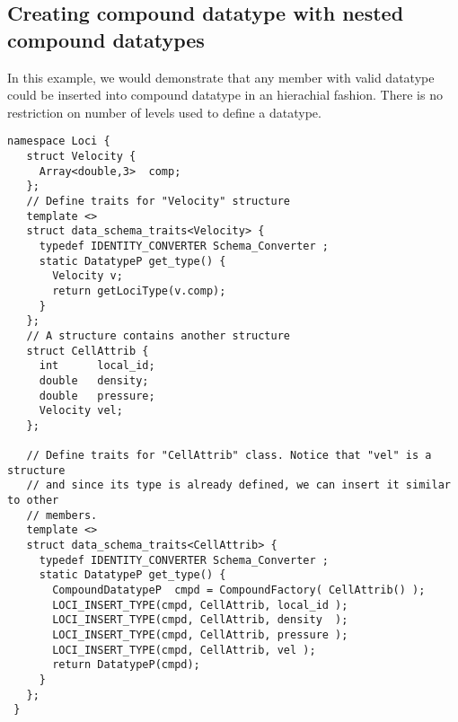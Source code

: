 \subsection{Creating compound datatype with nested compound
datatypes}
In this example, we would demonstrate that any member with valid
datatype could be inserted into compound datatype in an hierachial fashion. There
is no restriction on number of levels used to define a datatype.
\begin{verbatim}
namespace Loci {
   struct Velocity {
     Array<double,3>  comp;
   };
   // Define traits for "Velocity" structure
   template <>
   struct data_schema_traits<Velocity> {
     typedef IDENTITY_CONVERTER Schema_Converter ;
     static DatatypeP get_type() {
       Velocity v;
       return getLociType(v.comp);
     }
   };
   // A structure contains another structure
   struct CellAttrib {
     int      local_id;
     double   density;
     double   pressure;
     Velocity vel;
   };
 
   // Define traits for "CellAttrib" class. Notice that "vel" is a structure
   // and since its type is already defined, we can insert it similar to other
   // members.
   template <>
   struct data_schema_traits<CellAttrib> {
     typedef IDENTITY_CONVERTER Schema_Converter ;
     static DatatypeP get_type() {
       CompoundDatatypeP  cmpd = CompoundFactory( CellAttrib() );
       LOCI_INSERT_TYPE(cmpd, CellAttrib, local_id );
       LOCI_INSERT_TYPE(cmpd, CellAttrib, density  );
       LOCI_INSERT_TYPE(cmpd, CellAttrib, pressure );
       LOCI_INSERT_TYPE(cmpd, CellAttrib, vel );
       return DatatypeP(cmpd);
     }
   };
 }
\end{verbatim}

